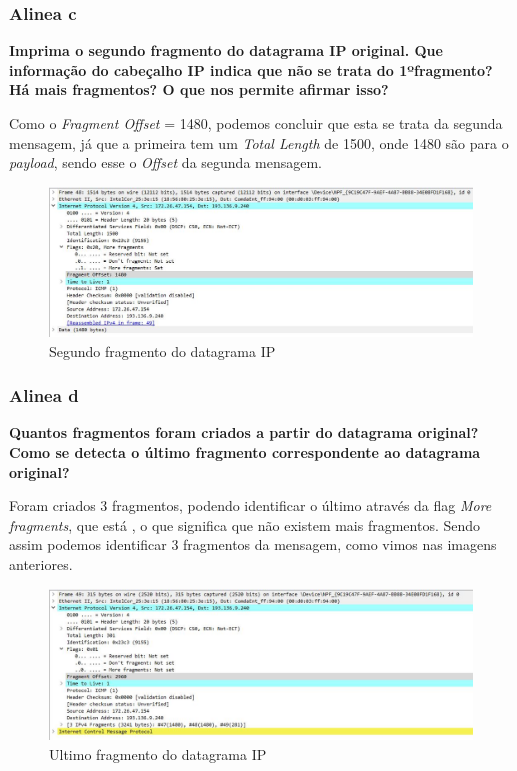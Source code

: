 \documentclass{article}
\begin{document}
\subsubsection{Alinea c}
\textbf{Imprima o segundo fragmento do datagrama IP original. Que informação do cabeçalho IP indica que não se trata do 1ºfragmento? Há mais fragmentos? O que nos permite afirmar isso?} \\\par
Como o \textit{Fragment Offset} = 1480, podemos concluir que esta se trata da segunda mensagem, já que a primeira tem um \textit{Total Length} de 1500, onde 1480 são para o \textit{payload}, sendo esse o \textit{Offset} da segunda mensagem.\\

\begin{figure}[h]
	\centering
	\includegraphics[scale = 0.5]{segundo-fragmento.JPG}
	\caption{Segundo fragmento do datagrama IP}
\end{figure}

\subsubsection{Alinea d}
\textbf{Quantos fragmentos foram criados a partir do datagrama original? Como se detecta o último fragmento correspondente ao datagrama original?} \\\par
Foram criados 3 fragmentos, podendo identificar o último através da flag \textit{More fragments}, que está , o que significa que não existem mais fragmentos. Sendo assim podemos identificar 3 fragmentos da mensagem, como vimos nas imagens anteriores.\\

\begin{figure}[h]
	\centering
	\includegraphics[scale = 0.5]{ultimo-fragmento.JPG}
	\caption{Ultimo fragmento do datagrama IP}
\end{figure}
\end{document}
